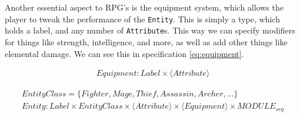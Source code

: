 Another essential aspect to RPG's is the equipment system, which allows the
player to tweak the performance of the \texttt{Entity}. This is simply a type,
which holds a label, and any number of \texttt{Attribute}s. This way we can
specify modifiers for things like strength, intelligence, and more, as well as
add other things like elemental damage. We can see this in specification
\ref{eq:equipment}.

\begin{equation}
\begin{split}
  \label{eq:equipment}
  Equipment\colon Label \times \langle Attribute \rangle
\end{split}
\end{equation}

\begin{equation}
\begin{split}
  \label{eq:entity}
  EntityClass = \{ Fighter, Mage, Thief, Assassin, Archer, ... \} \\
  Entity\colon Label \times
    EntityClass \times
    \langle Attribute \rangle \times
    \langle Equipment \rangle \times MODULE_{seq}
\end{split}
\end{equation}

